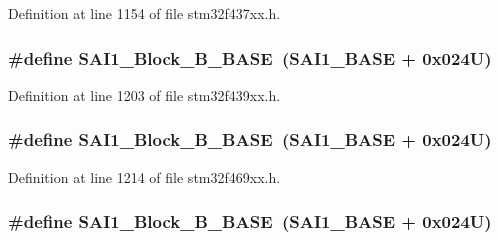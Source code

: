 Definition at line 1154 of file stm32f437xx.\+h.

\subsubsection[{\texorpdfstring{S\+A\+I1\+\_\+\+Block\+\_\+\+B\+\_\+\+B\+A\+SE}{SAI1_Block_B_BASE}}]{\setlength{\rightskip}{0pt plus 5cm}\#define S\+A\+I1\+\_\+\+Block\+\_\+\+B\+\_\+\+B\+A\+SE~({\bf S\+A\+I1\+\_\+\+B\+A\+SE} + 0x024\+U)}\hypertarget{group___peripheral__memory__map_gacdb59b321830def8c7a57c154178bc48}{}\label{group___peripheral__memory__map_gacdb59b321830def8c7a57c154178bc48}


Definition at line 1203 of file stm32f439xx.\+h.

\subsubsection[{\texorpdfstring{S\+A\+I1\+\_\+\+Block\+\_\+\+B\+\_\+\+B\+A\+SE}{SAI1_Block_B_BASE}}]{\setlength{\rightskip}{0pt plus 5cm}\#define S\+A\+I1\+\_\+\+Block\+\_\+\+B\+\_\+\+B\+A\+SE~({\bf S\+A\+I1\+\_\+\+B\+A\+SE} + 0x024\+U)}\hypertarget{group___peripheral__memory__map_gacdb59b321830def8c7a57c154178bc48}{}\label{group___peripheral__memory__map_gacdb59b321830def8c7a57c154178bc48}


Definition at line 1214 of file stm32f469xx.\+h.

\subsubsection[{\texorpdfstring{S\+A\+I1\+\_\+\+Block\+\_\+\+B\+\_\+\+B\+A\+SE}{SAI1_Block_B_BASE}}]{\setlength{\rightskip}{0pt plus 5cm}\#define S\+A\+I1\+\_\+\+Block\+\_\+\+B\+\_\+\+B\+A\+SE~({\bf S\+A\+I1\+\_\+\+B\+A\+SE} + 0x024\+U)}\hypertarget{group___peripheral__memory__map_gacdb59b321830def8c7a57c154178bc48}{}\label{group___peripheral__memory__map_gacdb59b321830def8c7a57c154178bc48}


